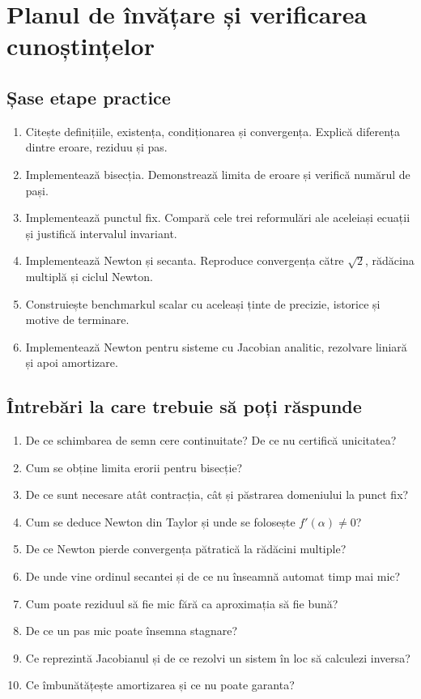 \documentclass[11pt,a4paper]{article}
\begin{document}
\section{Planul de învățare și verificarea cunoștințelor}
\subsection{Șase etape practice}
\begin{enumerate}
\item Citește definițiile, existența, condiționarea și convergența. Explică diferența dintre eroare, reziduu și pas.
\item Implementează bisecția. Demonstrează limita de eroare și verifică numărul de pași.
\item Implementează punctul fix. Compară cele trei reformulări ale aceleiași ecuații și justifică intervalul invariant.
\item Implementează Newton și secanta. Reproduce convergența către $\sqrt2$, rădăcina multiplă și ciclul Newton.
\item Construiește benchmarkul scalar cu aceleași ținte de precizie, istorice și motive de terminare.
\item Implementează Newton pentru sisteme cu Jacobian analitic, rezolvare liniară și apoi amortizare.
\end{enumerate}

\subsection{Întrebări la care trebuie să poți răspunde}
\begin{enumerate}
\item De ce schimbarea de semn cere continuitate? De ce nu certifică unicitatea?
\item Cum se obține limita erorii pentru bisecție?
\item De ce sunt necesare atât contracția, cât și păstrarea domeniului la punct fix?
\item Cum se deduce Newton din Taylor și unde se folosește $f'(\alpha)\ne0$?
\item De ce Newton pierde convergența pătratică la rădăcini multiple?
\item De unde vine ordinul secantei și de ce nu înseamnă automat timp mai mic?
\item Cum poate reziduul să fie mic fără ca aproximația să fie bună?
\item De ce un pas mic poate însemna stagnare?
\item Ce reprezintă Jacobianul și de ce rezolvi un sistem în loc să calculezi inversa?
\item Ce îmbunătățește amortizarea și ce nu poate garanta?
\end{enumerate}
\end{document}
